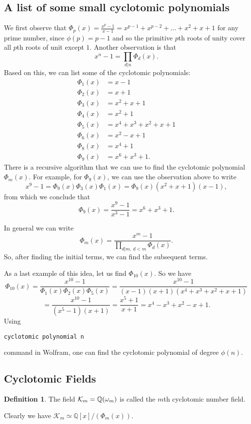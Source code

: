 \documentclass[12pt]{article}
\theoremstyle{plain}
\theoremstyle{definition}
\newtheorem{definition}{Definition}
\theoremstyle{remark}
\begin{document}
\subsection{A list of some small cyclotomic polynomials}
We first observe that 
$\Phi_p(x) = \frac{x^p-1}{x-1}=x^{p-1}+x^{p-2}+\dots +x^2+x+1$ for any prime number, since $\phi(p)=p-1$ and so the primitive $p$th roots of unity cover all $p$th roots of unit except $1$. 
Another observation is that 
$$x^n-1 = \prod_{d|n}\Phi_d(x).$$
Based on this, we can list some of the cyclotomic polynomials:
\begin{align*}
    \Phi_1(x)&=x-1\\
    \Phi_2(x)& =x+1\\
    \Phi_3(x)&=x^2+x+1\\
    \Phi_4(x)&=x^2+1\\
    \Phi_5(x)&=x^4+x^3+x^2+x+1\\
    \Phi_6(x)&=x^2-x+1\\
    \Phi_8(x)&=x^4+1\\
    \Phi_9(x)& = x^6+x^3+1.
\end{align*}
There is a recursive algorithm that we can use to find the cyclotomic polynomial $\Phi_m(x)$. For example, for $\Phi_9(x)$, we can use the observation above to write
$$x^9-1=\Phi_9(x)\Phi_3(x)\Phi_1(x) = \Phi_9(x)(x^2+x+1)(x-1),$$
from which we conclude that 
$$\Phi_9(x)=\frac{x^9-1}{x^3-1} = x^6+x^3+1.$$

In general we can write 
$$\Phi_m(x) = \frac{x^m-1}{\prod_{d|m,\:d<m}\Phi_d(x)}.$$
So, after finding the initial terms, we can find the subsequent terms. 

As a last example of this idea, let us find $\Phi_{10}(x)$. So we have
$$\Phi_{10}(x) = \frac{x^{10}-1}{\Phi_1(x)\Phi_2(x)\Phi_5(x)}
=\frac{x^{10}-1}{(x-1)(x+1)(x^4+x^3+x^2+x+1)}$$
$$=\frac{x^{10}-1}{(x^5-1)(x+1)} = \frac{x^5+1}{x+1} = x^4-x^3+x^2-x+1.$$
Using \begin{verbatim}cyclotomic polynomial n \end{verbatim} 
command in Wolfram, one can find the cyclotomic polynomial of degree $\phi(n)$. 
\subsection{Cyclotomic Fields}
\begin{definition}
The field $\mathcal{K}_m = \mathbb{Q}(\omega_m)$ is called the $m$th cyclotomic number field. 
\end{definition}
Clearly we have $\mathcal{K}_m \simeq \mathbb{Q}[x]/(\Phi_m(x))$.
\end{document}
